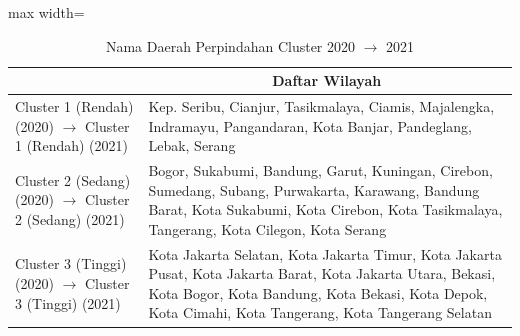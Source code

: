 \begin{table}[H]
\centering
\caption{Nama Daerah Perpindahan Cluster 2020 \(\rightarrow\) 2021} \label{tab:app2transname2020x2021}
\begin{adjustbox}{max width=\textwidth}
\begin{tabular}{|>{\centering\arraybackslash}p{4cm}|p{10cm}|}
\hline
\multicolumn{1}{|c|}{\textbf{Kategori}} & \multicolumn{1}{c|}{\textbf{Daftar Wilayah}} \\
\hline
Cluster 1 (Rendah) (2020) \(\rightarrow\) Cluster 1 (Rendah) (2021) & Kep. Seribu, Cianjur, Tasikmalaya, Ciamis, Majalengka, Indramayu, Pangandaran, Kota Banjar, Pandeglang, Lebak, Serang \\
\hline
Cluster 2 (Sedang) (2020) \(\rightarrow\) Cluster 2 (Sedang) (2021) & Bogor, Sukabumi, Bandung, Garut, Kuningan, Cirebon, Sumedang, Subang, Purwakarta, Karawang, Bandung Barat, Kota Sukabumi, Kota Cirebon, Kota Tasikmalaya, Tangerang, Kota Cilegon, Kota Serang \\
\hline
Cluster 3 (Tinggi) (2020) \(\rightarrow\) Cluster 3 (Tinggi) (2021) & Kota Jakarta Selatan, Kota Jakarta Timur, Kota Jakarta Pusat, Kota Jakarta Barat, Kota Jakarta Utara, Bekasi, Kota Bogor, Kota Bandung, Kota Bekasi, Kota Depok, Kota Cimahi, Kota Tangerang, Kota Tangerang Selatan \\
\hline
\end{tabular}
\end{adjustbox}
\end{table}